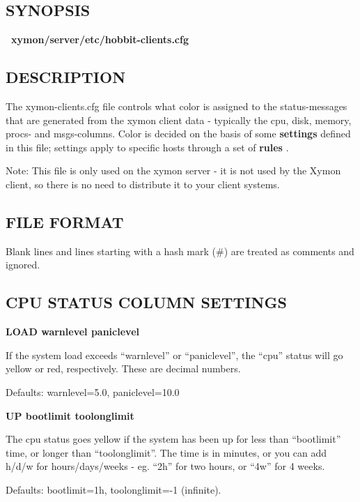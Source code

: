\subsection{SYNOPSIS}
\textbf{~xymon/server/etc/hobbit-clients.cfg}


 
\subsection{DESCRIPTION}
 The xymon-clients.cfg file controls what color is assigned to the status-messages that are generated from the xymon client data - typically the cpu, disk, memory, procs- and msgs-columns. Color is decided on the basis of some \textbf{settings}
 defined in this file; settings apply to specific hosts through a set of \textbf{rules}
. 

  Note: This file is only used on the xymon server - it is not used by the Xymon client, so there is no need to distribute it to your client systems. 


 
\subsection{FILE FORMAT}
 Blank lines and lines starting with a hash mark (\#) are treated as comments and ignored. 

 


 
\subsection{CPU STATUS COLUMN SETTINGS}


 \textbf{LOAD warnlevel paniclevel}



  If the system load exceeds ``warnlevel'' or ``paniclevel'', the ``cpu'' status will go yellow or red, respectively. These are decimal numbers. 


  Defaults: warnlevel=5.0, paniclevel=10.0 


 \textbf{UP bootlimit toolonglimit}



  The cpu status goes yellow if the system has been up for less than ``bootlimit'' time, or longer than ``toolonglimit''. The time is in minutes, or you can add h/d/w for hours/days/weeks - eg. ``2h'' for two hours, or ``4w'' for 4 weeks. 


  Defaults: bootlimit=1h, toolonglimit=-1 (infinite). 


